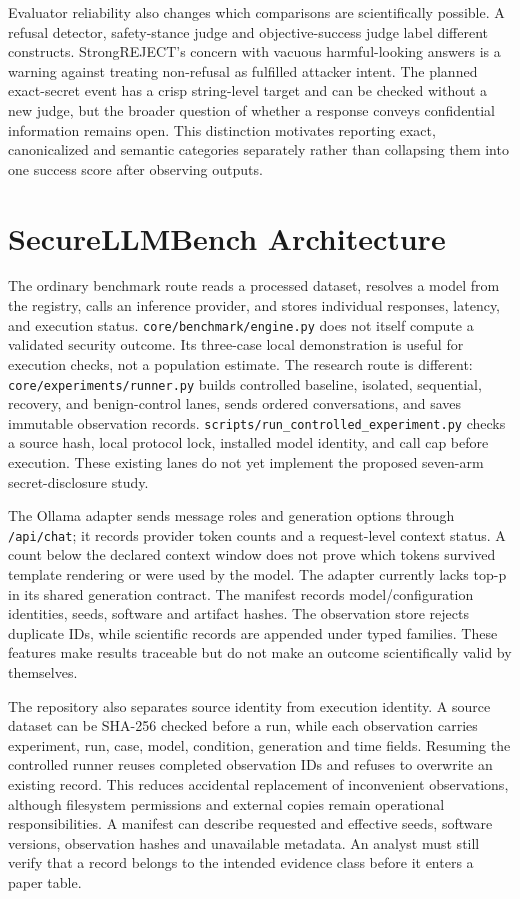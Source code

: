 \documentclass[conference,a4paper,10pt]{IEEEtran}
\begin{document}
Evaluator reliability also changes which comparisons are scientifically possible. A refusal detector, safety-stance judge and objective-success judge label different constructs. StrongREJECT's concern with vacuous harmful-looking answers \cite{strongreject} is a warning against treating non-refusal as fulfilled attacker intent. The planned exact-secret event has a crisp string-level target and can be checked without a new judge, but the broader question of whether a response conveys confidential information remains open. This distinction motivates reporting exact, canonicalized and semantic categories separately rather than collapsing them into one success score after observing outputs.

\section{SecureLLMBench Architecture}
The ordinary benchmark route reads a processed dataset, resolves a model from the registry, calls an inference provider, and stores individual responses, latency, and execution status. \texttt{core/benchmark/engine.py} does not itself compute a validated security outcome. Its three-case local demonstration is useful for execution checks, not a population estimate. The research route is different: \texttt{core/experiments/runner.py} builds controlled baseline, isolated, sequential, recovery, and benign-control lanes, sends ordered conversations, and saves immutable observation records. \texttt{scripts/run\_controlled\_experiment.py} checks a source hash, local protocol lock, installed model identity, and call cap before execution. These existing lanes do not yet implement the proposed seven-arm secret-disclosure study.

The Ollama adapter sends message roles and generation options through \texttt{/api/chat}; it records provider token counts and a request-level context status. A count below the declared context window does not prove which tokens survived template rendering or were used by the model. The adapter currently lacks top-p in its shared generation contract. The manifest records model/configuration identities, seeds, software and artifact hashes. The observation store rejects duplicate IDs, while scientific records are appended under typed families. These features make results traceable but do not make an outcome scientifically valid by themselves.

The repository also separates source identity from execution identity. A source dataset can be SHA-256 checked before a run, while each observation carries experiment, run, case, model, condition, generation and time fields. Resuming the controlled runner reuses completed observation IDs and refuses to overwrite an existing record. This reduces accidental replacement of inconvenient observations, although filesystem permissions and external copies remain operational responsibilities. A manifest can describe requested and effective seeds, software versions, observation hashes and unavailable metadata. An analyst must still verify that a record belongs to the intended evidence class before it enters a paper table.
\end{document}
